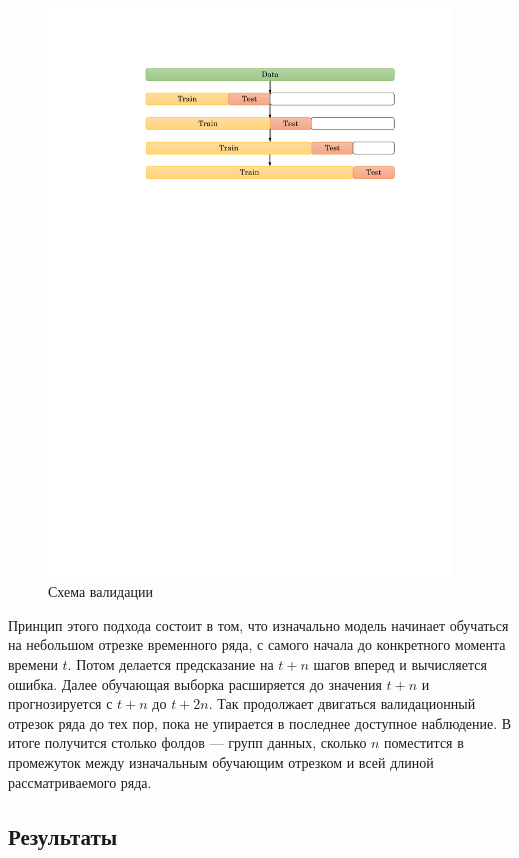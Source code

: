 \documentclass[14pt]{extarticle}
\begin{document}
\begin{figure}[h]
	\centering
	\includegraphics[width=0.95\textwidth]{img/sliding_window_val.pdf}
	\caption{Схема валидации}
	\label{fig:sliding_window}
\end{figure}

Принцип этого подхода состоит в том, что изначально модель начинает обучаться на небольшом отрезке временного ряда, с самого начала до конкретного момента времени $t$. Потом делается предсказание на $t + n$  шагов вперед и вычисляется ошибка. Далее обучающая выборка расширяется до значения $t + n$ и прогнозируется с $t + n$ до $t + 2n$. Так продолжает двигаться валидационный отрезок ряда до тех пор, пока не упирается в последнее доступное наблюдение. В итоге получится столько фолдов --- групп данных, сколько $n$ поместится в промежуток между изначальным обучающим отрезком и всей длиной рассматриваемого ряда.


\subsection{Результаты}
\end{document}
